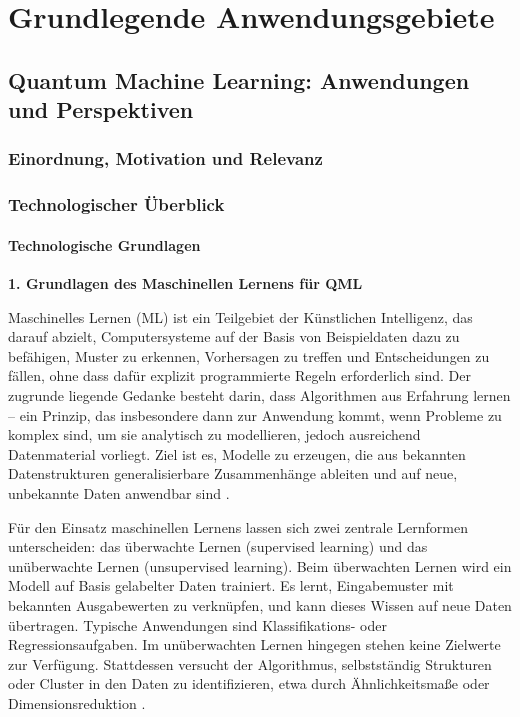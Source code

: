 \chapter{Grundlegende Anwendungsgebiete}
\label{trends} %



\section{Quantum Machine Learning: Anwendungen und Perspektiven}
\subsection{Einordnung, Motivation und Relevanz}

\subsection{Technologischer Überblick}


\subsubsection{Technologische Grundlagen}

\noindent\textbf{1. Grundlagen des Maschinellen Lernens für QML}  

\noindent  
Maschinelles Lernen (ML) ist ein Teilgebiet der Künstlichen Intelligenz, das darauf abzielt, Computersysteme auf der Basis von Beispieldaten dazu zu befähigen, Muster zu erkennen, Vorhersagen zu treffen und Entscheidungen zu fällen, ohne dass dafür explizit programmierte Regeln erforderlich sind. Der zugrunde liegende Gedanke besteht darin, dass Algorithmen aus Erfahrung lernen – ein Prinzip, das insbesondere dann zur Anwendung kommt, wenn Probleme zu komplex sind, um sie analytisch zu modellieren, jedoch ausreichend Datenmaterial vorliegt. Ziel ist es, Modelle zu erzeugen, die aus bekannten Datenstrukturen generalisierbare Zusammenhänge ableiten und auf neue, unbekannte Daten anwendbar sind \cite{alpaydin2022,kreutzer2019}.  

Für den Einsatz maschinellen Lernens lassen sich zwei zentrale Lernformen unterscheiden: das überwachte Lernen (supervised learning) und das unüberwachte Lernen (unsupervised learning). Beim überwachten Lernen wird ein Modell auf Basis gelabelter Daten trainiert. Es lernt, Eingabemuster mit bekannten Ausgabewerten zu verknüpfen, und kann dieses Wissen auf neue Daten übertragen. Typische Anwendungen sind Klassifikations- oder Regressionsaufgaben. Im unüberwachten Lernen hingegen stehen keine Zielwerte zur Verfügung. Stattdessen versucht der Algorithmus, selbstständig Strukturen oder Cluster in den Daten zu identifizieren, etwa durch Ähnlichkeitsmaße oder Dimensionsreduktion \cite{weber2020}.  

